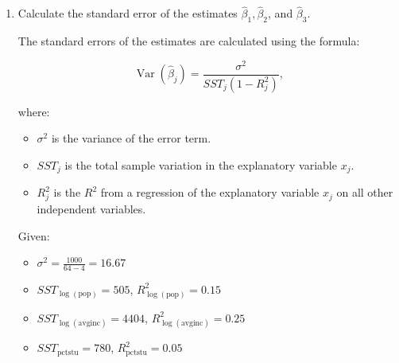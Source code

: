 \documentclass[12pt]{article}
\begin{document}
\begin{enumerate}
{\begin{enumerate}
    The regression model is:
    \[
    \log (\text{rent}) = 0.43 + 0.066 \log (\text{pop}) + 0.507 \log (\text{avginc}) + 0.0056 \text{pctstu}.
    \]
    \begin{itemize}
        \item \( \hat{\beta}_1 = 0.066 \): A 1\% increase in the total population (\( \log (\text{pop}) \)) is associated with an approximate 0.066\% increase in the average rent, holding other factors constant.
        \item \( \hat{\beta}_2 = 0.507 \): A 1\% increase in the average income (\( \log (\text{avginc}) \)) is associated with an approximate 0.507\% increase in the average rent, holding other factors constant.
        \item \( \hat{\beta}_3 = 0.0056 \): A 1 percentage point increase in the student population as a percentage of the total population (\( \text{pctstu} \)) is associated with an approximate 0.56\% increase in the average rent, holding other factors constant.
    \end{itemize}

    \item Calculate the standard error of the estimates \( \widehat{\beta}_1, \hat{\beta}_2 \), and \( \hat{\beta}_3 \).

    The standard errors of the estimates are calculated using the formula:

\[
\operatorname{Var}\left(\widehat{\beta}_j\right) = \frac{\sigma^2}{SST_j\left(1 - R_j^2\right)},
\]

where:
\begin{itemize}
    \item  \( \sigma^2 \) is the variance of the error term.
 \item \( SST_j \) is the total sample variation in the explanatory variable \( x_j \).
 \item \( R_j^2 \) is the \( R^2 \) from a regression of the explanatory variable \( x_j \) on all other independent variables.
\end{itemize}


Given:
\begin{itemize}
    \item \( \sigma^2 = \frac{1000}{64 - 4} = 16.67 \)
 \item \( SST_{\log(\text{pop})} = 505 \), \( R_{\log(\text{pop})}^2 = 0.15 \)
 \item \( SST_{\log(\text{avginc})} = 4404 \), \( R_{\log(\text{avginc})}^2 = 0.25 \)
 \item \( SST_{\text{pctstu}} = 780 \), \( R_{\text{pctstu}}^2 = 0.05 \)
\end{itemize}


\end{enumerate}}
\end{enumerate}
\end{document}
